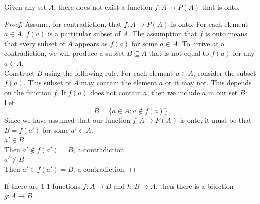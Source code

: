 \documentclass[11pt]{article}
\begin{document}
Given any set $A$, there does not exist a function $f: A \rightarrow P(A)$ that is onto.
\begin{proof}
	Assume, for contradiction, that $f: A \rightarrow P(A)$ is onto. For each element $a \in A$, $f(a)$ is a particular subset of $A$. The assumption that $f$ is onto means that every subset of $A$ appears as $f(a)$ for some $a \in A$. To arrive at a contradiction, we will produce a subset $B \subseteq A$ that is not equal to $f(a)$ for any $a \in A$.\\
	Construct $B$ using the following rule. For each element $a \in A$, consider the subset $f(a)$. This subset of $A$ may contain the element $a$ or it may not. This depends on the function $f$. If $f(a)$ does not contain $a$, then we include $a$ in our set $B$: Let 
	$$B = \{a \in A: a \notin f(a)\}$$
	Since we have assumed that our function $f: A \rightarrow P(A)$ is onto, it must be that $B = f(a')$ for some $a' \in A$.\\
	 $a' \in B$ \\
	Then $a' \notin f(a') = B$, a contradiction. \\
	 $a' \notin B$ \\
	Then $a' \in f(a') = B$, a contradiction.
\end{proof}


If there are 1-1 functions $f: A \rightarrow B$ and $h: B \rightarrow A$, then there is a bijection $g: A \rightarrow B$.
\end{document}
